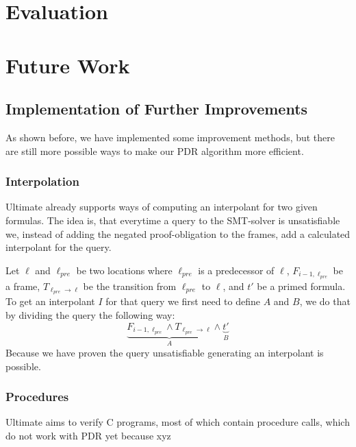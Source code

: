 \documentclass[11pt, a4paper, BCOR=10mm, ngerman, oneside]{scrbook}
\begin{document}
\chapter{Evaluation}


\chapter{Future Work}
\section{Implementation of Further Improvements}
As shown before, we have implemented some improvement methods, but there are still more possible ways to make our PDR algorithm more efficient.

\subsection{Interpolation}
Ultimate already supports ways of computing an interpolant for two given formulas. The idea is, that everytime a query to the SMT-solver is unsatisfiable we, instead of adding the negated proof-obligation to the frames, add a calculated interpolant for the query. \par
Let $\ell$ and $\ell_{pre}$ be two locations where $\ell_{pre}$ is a predecessor of $\ell$, $F_{i - 1, \ell_{pre}}$ be a frame, $T_{\ell_{pre} \rightarrow \ell}$ be the transition from $\ell_{pre}$ to $\ell$, and $t'$ be a primed formula. \\
To get an interpolant $I$ for that query we first need to define $A$ and $B$, we do that by dividing the query the following way:
\begin{equation*}
\underbrace{F_{i - 1, \ell_{pre}} \land T_{\ell_{pre} \rightarrow \ell}}_{A} \land \underbrace{t'}_B
\end{equation*}
Because we have proven the query unsatisfiable generating an interpolant is possible. \\

\subsection{Procedures}
Ultimate aims to verify C programs, most of which contain procedure calls, which do not work with PDR yet because xyz


\pagebreak
\end{document}
